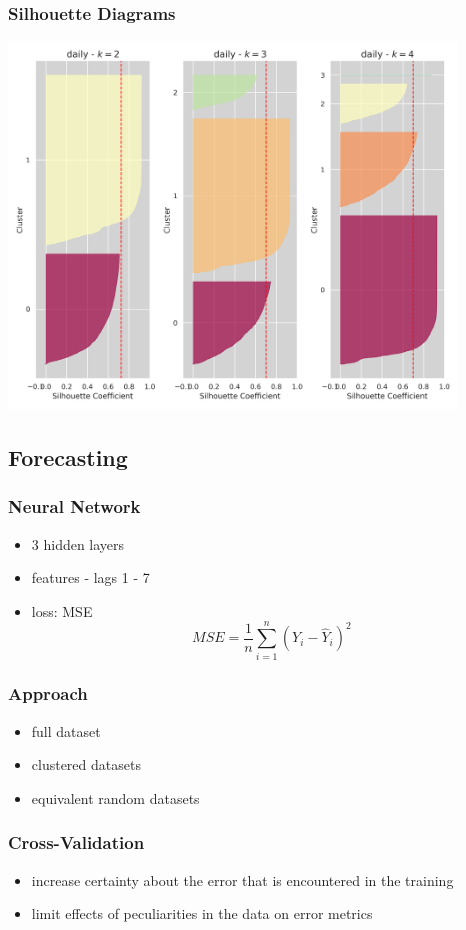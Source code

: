 \documentclass[11pt]{article}
\begin{document}
\subsubsection*{Silhouette Diagrams}
\label{sec:orgea89b3c}
\begin{center}
\includegraphics[width=450px]{./img/daily_kmeans_sil_dia_series.png}
\end{center}
\subsection*{Forecasting}
\label{sec:org6e1930c}
\subsubsection*{Neural Network}
\label{sec:org92daa3f}
\begin{itemize}
\item 3 hidden layers
\item features - lags 1 - 7
\item loss: MSE
$$ MSE = \frac{1}{n} \sum_{i=1}^n (Y_i - \hat{Y}_i)^2 $$
\end{itemize}
\subsubsection*{Approach}
\label{sec:org64f874c}
\begin{itemize}
\item full dataset
\item clustered datasets
\item equivalent random datasets
\end{itemize}
\subsubsection*{Cross-Validation}
\label{sec:orgedcb95b}
\begin{itemize}
\item increase certainty about the error that is encountered in the training
\item limit effects of peculiarities in the data on error metrics
\end{itemize}
\end{document}
